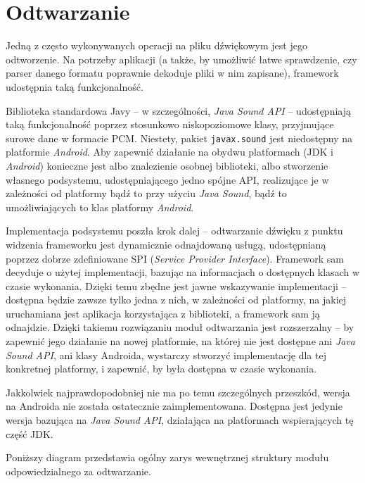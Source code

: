 
\section{Odtwarzanie}

Jedną z często wykonywanych operacji na pliku dźwiękowym jest jego odtworzenie. Na potrzeby
aplikacji (a także, by umożliwić łatwe sprawdzenie, czy parser danego formatu poprawnie dekoduje
pliki w nim zapisane), framework udostępnia taką funkcjonalność.

Biblioteka standardowa Javy -- w szczególności, \emph{Java Sound API} -- udostępniają taką
funkcjonalność poprzez stosunkowo niskopoziomowe klasy, przyjmujące surowe dane w formacie PCM.
Niestety, pakiet \texttt{javax.sound} jest niedostępny na platformie \emph{Android}. Aby zapewnić
działanie na obydwu platformach (JDK i \emph{Android}) konieczne jest albo znalezienie osobnej
biblioteki, albo stworzenie własnego podsystemu, udostępniającego jedno spójne API, realizujące je w
zależności od platformy bądź to przy użyciu \emph{Java Sound}, bądź to umożliwiających to klas
platformy \emph{Android}.

Implementacja podsystemu poszła krok dalej -- odtwarzanie dźwięku z punktu widzenia frameworku jest
dynamicznie odnajdowaną usługą, udostępnianą poprzez dobrze zdefiniowane SPI (\textit{Service
Provider Interface}). Framework sam decyduje o użytej implementacji, bazując na informacjach o
dostępnych klasach w czasie wykonania. Dzięki temu zbędne jest jawne wskazywanie implementacji --
dostępna będzie zawsze tylko jedna z nich, w zależności od platformy, na jakiej uruchamiana jest
aplikacja korzystająca z biblioteki, a framework sam ją odnajdzie. Dzięki takiemu rozwiązaniu moduł
odtwarzania jest rozszerzalny -- by zapewnić jego działanie na nowej platformie, na której nie jest
dostępne ani \emph{Java Sound API}, ani klasy Androida, wystarczy stworzyć implementację dla tej
konkretnej platformy, i zapewnić, by była dostępna w czasie wykonania.

\begin{Caution}
Jakkolwiek najprawdopodobniej nie ma po temu szczególnych przeszkód, wersja na Androida nie została
ostatecznie zaimplementowana. Dostępna jest jedynie wersja bazująca na \emph{Java Sound API},
działająca na platformach wspierających tę część JDK.
\end{Caution}

\bigskip

Poniższy diagram przedstawia ogólny zarys wewnętrznej struktury modułu odpowiedzialnego za
odtwarzanie.

